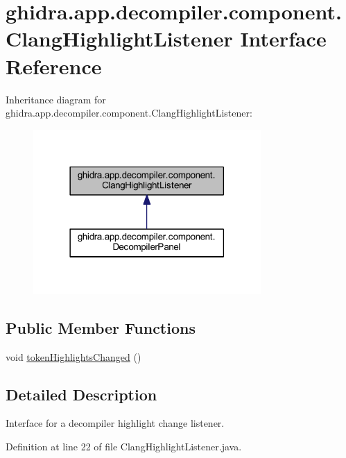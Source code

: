 \hypertarget{interfaceghidra_1_1app_1_1decompiler_1_1component_1_1_clang_highlight_listener}{}\section{ghidra.\+app.\+decompiler.\+component.\+Clang\+Highlight\+Listener Interface Reference}
\label{interfaceghidra_1_1app_1_1decompiler_1_1component_1_1_clang_highlight_listener}


Inheritance diagram for ghidra.\+app.\+decompiler.\+component.\+Clang\+Highlight\+Listener\+:
\nopagebreak
\begin{figure}[H]
\begin{center}
\leavevmode
\includegraphics[width=246pt]{interfaceghidra_1_1app_1_1decompiler_1_1component_1_1_clang_highlight_listener__inherit__graph}
\end{center}
\end{figure}
\subsection*{Public Member Functions}
\begin{DoxyCompactItemize}
\item 
void \mbox{\hyperlink{interfaceghidra_1_1app_1_1decompiler_1_1component_1_1_clang_highlight_listener_a658c0e626c607be6fa4206374bd861fa}{token\+Highlights\+Changed}} ()
\end{DoxyCompactItemize}


\subsection{Detailed Description}
Interface for a decompiler highlight change listener. 

Definition at line 22 of file Clang\+Highlight\+Listener.\+java.



